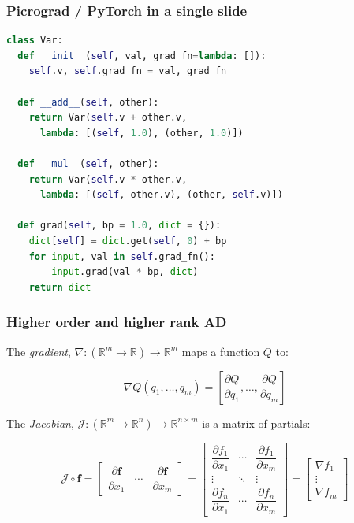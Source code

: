 \documentclass{beamer}
\begin{document}
    \begin{frame}[fragile]
        \frametitle{Picrograd / PyTorch in a single slide}
        \begin{lstlisting}[language=Python, linewidth=1.1\linewidth]
class Var:
  def __init__(self, val, grad_fn=lambda: []):
    self.v, self.grad_fn = val, grad_fn

  def __add__(self, other):
    return Var(self.v + other.v,
      lambda: [(self, 1.0), (other, 1.0)])

  def __mul__(self, other):
    return Var(self.v * other.v,
      lambda: [(self, other.v), (other, self.v)])

  def grad(self, bp = 1.0, dict = {}):
    dict[self] = dict.get(self, 0) + bp
    for input, val in self.grad_fn():
        input.grad(val * bp, dict)
    return dict
        \end{lstlisting}
    \end{frame}

    \begin{frame}
        \frametitle{Higher order and higher rank AD}

        The \textit{gradient}, $\nabla: (\mathbb{R}^m\rightarrow\mathbb{R})\rightarrow\mathbb{R}^m$ maps a function $Q$ to:

        \begin{equation*}
            \nabla Q(q_1, \dots, q_m) = \left[ \frac{\partial Q}{\partial q_1}, \dots, \frac{\partial Q}{\partial q_m}\right]
        \end{equation*}

        The \textit{Jacobian}, $\mathcal{J}: (\mathbb{R}^m\rightarrow\mathbb{R}^n)\rightarrow\mathbb{R}^{n \times m}$ is a matrix of partials:

        \begin{equation*}
            \mathcal{J}\circ\mathbf{f} =
            \begin{bmatrix}
                \dfrac{\partial \mathbf{f}}{\partial x_1} & \cdots & \dfrac{\partial \mathbf{f}}{\partial x_m}
            \end{bmatrix} =
            \begin{bmatrix}
                \dfrac{\partial f_1}{\partial x_1} & \cdots & \dfrac{\partial f_1}{\partial x_m}\\
                \vdots & \ddots & \vdots\\
                \dfrac{\partial f_n}{\partial x_1} & \cdots & \dfrac{\partial f_n}{\partial x_m}
            \end{bmatrix} =
            \begin{bmatrix}
                \nabla f_1 \\
                \vdots \\
                \nabla f_m
            \end{bmatrix}
        \end{equation*}
    \end{frame}
\end{document}
